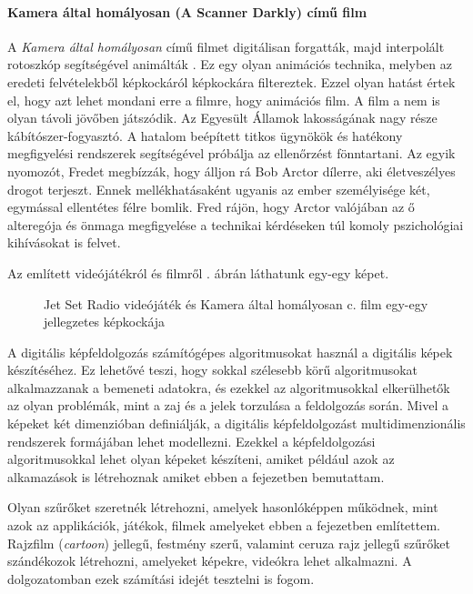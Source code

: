 \paragraph{Kamera által homályosan (A Scanner Darkly) című film} 

A \textit{Kamera által homályosan} című filmet digitálisan forgatták, majd interpolált rotoszkóp segítségével animálták \cite{scannerdarkly}. Ez egy olyan animációs technika, melyben az eredeti felvételekből képkockáról képkockára filtereztek. Ezzel olyan hatást értek el, hogy azt lehet mondani erre a filmre, hogy animációs film. A film a nem is olyan távoli jövőben játszódik. Az Egyesült Államok lakosságának nagy része kábítószer-fogyasztó. A hatalom beépített titkos ügynökök és hatékony megfigyelési rendszerek segítségével próbálja az ellenőrzést fönntartani. Az egyik nyomozót, Fredet megbízzák, hogy álljon rá Bob Arctor dílerre, aki életveszélyes drogot terjeszt. Ennek mellékhatásaként ugyanis az ember személyisége két, egymással ellentétes félre bomlik. Fred rájön, hogy Arctor valójában az ő alteregója és önmaga megfigyelése a technikai kérdéseken túl komoly pszichológiai kihívásokat is felvet. %

Az említett videójátékról és filmről . ábrán láthatunk egy-egy képet.

\begin{figure}[ht]
\centering
{}
\caption{Jet Set Radio videójáték és Kamera által homályosan c. film egy-egy jellegzetes képkockája} 
\label{fig:jetset}
\end{figure}


A digitális képfeldolgozás számítógépes algoritmusokat használ a digitális képek készítéséhez. Ez lehetővé teszi, hogy sokkal szélesebb körű algoritmusokat alkalmazzanak a bemeneti adatokra, és ezekkel az algoritmusokkal elkerülhetők az olyan problémák, mint a zaj és a jelek torzulása a feldolgozás során. Mivel a képeket két dimenzióban definiálják, a digitális képfeldolgozást multidimenzionális rendszerek formájában lehet modellezni.  Ezekkel a képfeldolgozási algoritmusokkal lehet olyan képeket készíteni, amiket például azok az alkamazások is létrehoznak amiket ebben a fejezetben bemutattam.



Olyan szűrőket szeretnék létrehozni, amelyek hasonlóképpen működnek, mint azok az applikációk, játékok, filmek amelyeket ebben a fejezetben említettem. Rajzfilm (\textit{cartoon}) jellegű, festmény szerű, valamint ceruza rajz jellegű szűrőket szándékozok létrehozni, amelyeket képekre, videókra lehet alkalmazni. A dolgozatomban ezek számítási idejét tesztelni is fogom.
